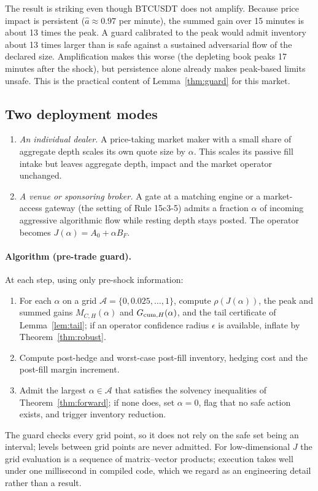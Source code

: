 \documentclass[12pt]{article}
\theoremstyle{definition}
\theoremstyle{remark}
\begin{document}
The result is striking even though BTCUSDT does not amplify. Because price impact is persistent ($\hat a\approx0.97$ per minute), the summed gain over 15 minutes is about 13 times the peak. A guard calibrated to the peak would admit inventory about 13 times larger than is safe against a sustained adversarial flow of the declared size. Amplification makes this worse (the depleting book peaks 17 minutes after the shock), but persistence alone already makes peak-based limits unsafe. This is the practical content of Lemma~\ref{thm:guard} for this market.

\subsection{Two deployment modes}

\begin{enumerate}[label=\textbf{Mode \Alph*.},leftmargin=*]
\item \emph{An individual dealer.} A price-taking market maker with a small share of aggregate depth scales its own quote size by $\alpha$. This scales its passive fill intake but leaves aggregate depth, impact and the market operator unchanged.
\item \emph{A venue or sponsoring broker.} A gate at a matching engine or a market-access gateway (the setting of Rule 15c3-5) admits a fraction $\alpha$ of incoming aggressive algorithmic flow while resting depth stays posted. The operator becomes $J(\alpha)=A_0+\alpha B_F$.
\end{enumerate}

\paragraph{Algorithm (pre-trade guard).} At each step, using only pre-shock information:
\begin{enumerate}[itemsep=1pt]
\item For each $\alpha$ on a grid $\mathcal A=\{0,0.025,\ldots,1\}$, compute $\rho(J(\alpha))$, the peak and summed gains $M_{C,H}(\alpha)$ and $G_{{\rm cum},H}(\alpha)$, and the tail certificate of Lemma~\ref{lem:tail}; if an operator confidence radius $\epsilon$ is available, inflate by Theorem~\ref{thm:robust}.
\item Compute post-hedge and worst-case post-fill inventory, hedging cost and the post-fill margin increment.
\item Admit the largest $\alpha\in\mathcal A$ that satisfies the solvency inequalities of Theorem~\ref{thm:forward}; if none does, set $\alpha=0$, flag that no safe action exists, and trigger inventory reduction.
\end{enumerate}
The guard checks every grid point, so it does not rely on the safe set being an interval; levels between grid points are never admitted. For low-dimensional $J$ the grid evaluation is a sequence of matrix--vector products; execution takes well under one millisecond in compiled code, which we regard as an engineering detail rather than a result.
\end{document}
